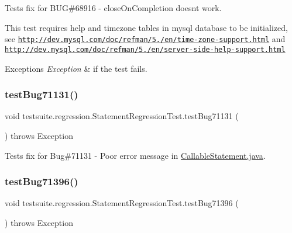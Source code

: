Tests fix for B\+UG\#68916 -\/ close\+On\+Completion doesn\textquotesingle{}t work.

This test requires help and timezone tables in mysql database to be initialized, see \href{http://dev.mysql.com/doc/refman/5.7/en/time-zone-support.html}{\tt http\+://dev.\+mysql.\+com/doc/refman/5./en/time-\/zone-\/support.\+html} and \href{http://dev.mysql.com/doc/refman/5.7/en/server-side-help-support.html}{\tt http\+://dev.\+mysql.\+com/doc/refman/5./en/server-\/side-\/help-\/support.\+html}


\begin{DoxyExceptions}{Exceptions}
{\em Exception} & if the test fails. \\
\hline
\end{DoxyExceptions}
\mbox{\label{classtestsuite_1_1regression_1_1_statement_regression_test_a1e38b360b51a8f9704cef9040eb6a44d}} 
\subsubsection{\texorpdfstring{test\+Bug71131()}{testBug71131()}}
{\footnotesize\ttfamily void testsuite.\+regression.\+Statement\+Regression\+Test.\+test\+Bug71131 (\begin{DoxyParamCaption}{ }\end{DoxyParamCaption}) throws Exception}

Tests fix for Bug\#71131 -\/ Poor error message in \mbox{\hyperlink{_callable_statement_8java}{Callable\+Statement.\+java}}. \mbox{\label{classtestsuite_1_1regression_1_1_statement_regression_test_a716338573789cf539312a6527ddd2ea6}} 
\subsubsection{\texorpdfstring{test\+Bug71396()}{testBug71396()}}
{\footnotesize\ttfamily void testsuite.\+regression.\+Statement\+Regression\+Test.\+test\+Bug71396 (\begin{DoxyParamCaption}{ }\end{DoxyParamCaption}) throws Exception}

